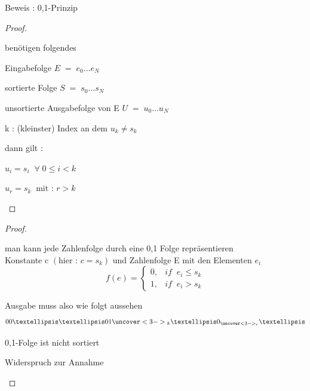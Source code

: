 \documentclass[ucs,9pt]{beamer}
\begin{document}
\begin{frame}{Beweis : 0,1-Prinzip}
\begin{proof}
\begin{itemize}
\item benötigen folgendes
\begin{itemize}
 {\item Eingabefolge $E \; = \; e_0 … e_N$}
 {\item sortierte Folge $S\; = \; s_0 … s_N$}
 {\item unsortierte Ausgabefolge von E $U \; = \; u_0 … u_N$}
 {\item k : (kleinster) Index an dem $u_k \neq s_k$}
\end{itemize}
 {\item dann gilt :
\begin{enumerate}
\item[(1)] $u_i = s_i \;\;\forall \;0 \leq i < k$ 
 {\item[(2)] $u_r = s_k \;\; \text{mit : }r>k  $}
\end{enumerate}}
\end{itemize}
\end{proof}
\end{frame} 

\begin{frame}
\begin{proof}
\begin{itemize}
\item 
    man kann jede Zahlenfolge durch eine 0,1 Folge repräsentieren\\
    Konstante c $(\text{hier : }c = s_k)$ und Zahlenfolge E mit den Elementen $e_i$\\
    $$
    f(e) = \begin{cases} 0 , & if \;\; e_i \leq s_k \\
    1 , & if \;\; e_i > s_k
    \end{cases}$$
 {\item Ausgabe muss also wie folgt aussehen 
$$ 00 …… 01{\uncover <3-> {_k}}…0_{\uncover <3-> {_r}} …$$}
 {\item[$\Rightarrow$] 0,1-Folge ist nicht sortiert}
 {\item[$\Rightarrow$] Widerspruch zur Annahme }
\end{itemize}
\end{proof}
\end{frame}
\end{document}

